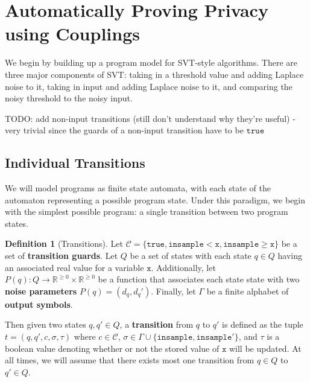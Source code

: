 \documentclass[12pt]{article}
\newcommand{\RR}{\mathbb{R}}
\newcommand{\gguard}[1][x]{\texttt{insample}\geq #1}
\newcommand{\lguard}[1][x]{\texttt{insample} < #1}
\theoremstyle{definition}
\newtheorem{defn}[thm]{Definition}
\begin{document}
\section{Automatically Proving Privacy using Couplings}

We begin by building up a program model for SVT-style algorithms. There are three major components of SVT: taking in a threshold value and adding Laplace noise to it, taking in input and adding Laplace noise to it, and comparing the noisy threshold to the noisy input. 

{\color{red} TODO: add non-input transitions (still don't understand why they're useful) - very trivial since the guards of a non-input transition have to be $\texttt{true}$}

\subsection{Individual Transitions}
We will model programs as finite state automata, with each state of the automaton representing a possible program state. Under this paradigm, we begin with the simplest possible program: a single transition between two program states. 

\begin{defn}[Transitions]
    Let $\mathcal{C}=\{\texttt{true}, \lguard[\texttt{x}], \gguard[\texttt{x}]\}$ be a set of \textbf{transition guards}. Let $Q$ be a set of states with each state $q\in Q$ having an associated real value for a variable $\texttt{x}$. Additionally, let $P(q): Q\to \RR^{\geq 0}\times \RR^{\geq 0}$ be a function that associates each state state with two \textbf{noise parameters} $P(q) = (d_q, d_q')$. Finally, let $\Gamma$ be a finite alphabet of \textbf{output symbols}. 

    Then given two states $q, q'\in Q$, a \textbf{transition} from $q$ to $q'$ is defined as the tuple $t = (q, q', c, \sigma,\tau)$ where $c\in \mathcal{C}$, $\sigma\in \Gamma\cup\{\texttt{insample}, \texttt{insample}'\}$, and $\tau$ is a boolean value denoting whether or not the stored value of $\texttt{x}$ will be updated. At all times, we will assume that there exists most one transition from $q\in Q$ to $q'\in Q$. 
\end{defn}
\end{document}
